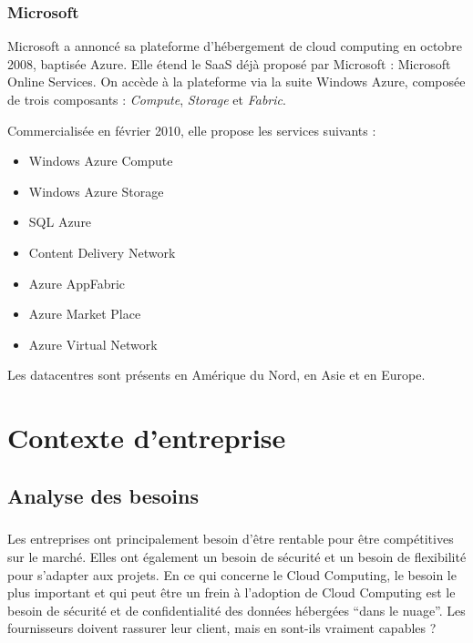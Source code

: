 \documentclass[a4paper,12pt]{report}
\begin{document}
\begin{onehalfspace}
	\subsection{Microsoft}
Microsoft a annoncé sa plateforme d'hébergement de cloud computing en octobre 2008, baptisée Azure. Elle étend le SaaS déjà proposé par Microsoft : Microsoft Online Services. On accède à la plateforme via la suite Windows Azure, composée de trois composants : \textit{Compute}, \textit{Storage} et \textit{Fabric}.

Commercialisée en février 2010, elle propose les services suivants :
\begin{itemize}
\item Windows Azure Compute
\item Windows Azure Storage
\item SQL Azure
\item Content Delivery Network
\item Azure AppFabric
\item Azure Market Place
\item Azure Virtual Network
\end{itemize}

Les datacentres sont présents en Amérique du Nord, en Asie et en Europe.

	
	\chapter{Contexte d’entreprise}
	
	\section{Analyse des besoins}

	\paragraph*{}
	Les entreprises ont principalement besoin d’être rentable pour être compétitives sur le marché. Elles ont également un besoin de sécurité et un besoin de flexibilité pour s’adapter aux projets. En ce qui concerne le Cloud Computing, le besoin le plus important et qui peut être un frein à l’adoption de Cloud Computing est le besoin de sécurité et de confidentialité des données hébergées “dans le nuage”. Les fournisseurs doivent rassurer leur client, mais en sont-ils vraiment capables ?


\end{onehalfspace}
\end{document}
